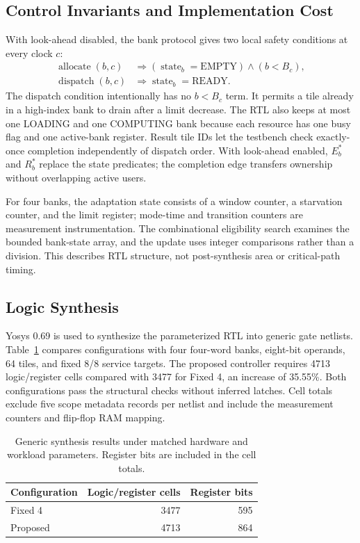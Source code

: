 \documentclass[twocolumn,10pt]{article}
\begin{document}
\subsection{Control Invariants and Implementation Cost}
With look-ahead disabled, the bank protocol gives two local safety
conditions at every clock $c$:
\begin{align}
\operatorname{allocate}(b,c)&\Rightarrow
  (\operatorname{state}_b=\mathrm{EMPTY})\land(b<B_c),\\
\operatorname{dispatch}(b,c)&\Rightarrow
  \operatorname{state}_b=\mathrm{READY}.
\end{align}
The dispatch condition intentionally has no $b<B_c$ term. It permits a
tile already in a high-index bank to drain after a limit decrease. The RTL
also keeps at most one LOADING and one COMPUTING bank because each resource
has one busy flag and one active-bank register. Result tile IDs let the
testbench check exactly-once completion independently of dispatch order.
With look-ahead enabled, $E_b^*$ and $R_b^*$ replace the state predicates;
the completion edge transfers ownership without overlapping active users.

For four banks, the adaptation state consists of a window counter,
a starvation counter, and the limit register; mode-time and transition
counters are measurement instrumentation. The combinational eligibility
search examines the bounded bank-state array, and the update uses integer
comparisons rather than a division. This describes RTL structure, not
post-synthesis area or critical-path timing.

\subsection{Logic Synthesis}
Yosys 0.69 is used to synthesize the parameterized RTL into generic gate
netlists. Table~\ref{tab:synthesis} compares configurations with four
four-word banks, eight-bit operands, 64 tiles, and fixed 8/8 service targets.
The proposed controller requires 4713 logic/register cells compared with
3477 for Fixed 4, an increase of 35.55\%. Both configurations pass the structural checks without
inferred latches. Cell totals exclude five scope metadata records per
netlist and include the measurement counters and flip-flop RAM mapping.

\begin{table}[t]
\centering\caption{Generic synthesis results under matched hardware and
workload parameters. Register bits are included in the cell totals.}
\label{tab:synthesis}\scriptsize
\begin{tabular}{lrr}
\toprule
Configuration & Logic/register cells & Register bits\\
\midrule
Fixed 4 & 3477 & 595\\
Proposed & 4713 & 864\\
\bottomrule
\end{tabular}
\end{table}
\end{document}
